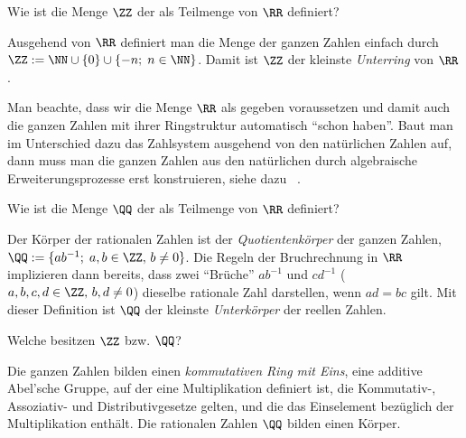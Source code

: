 \begin{frage}
  Wie ist die Menge $\ZZ$ der  
  als Teilmenge von $\RR$ definiert?
\end{frage}

\begin{antwort}
  Ausgehend von $\RR$ definiert man die Menge der ganzen Zahlen einfach 
  durch $\ZZ := \NN \cup \{ 0 \} \cup \{ -n; \; n\in\NN \}$. Damit 
  ist $\ZZ$ der kleinste \textit{Unterring} von $\RR$.  

  Man beachte, dass wir die Menge $\RR$ als gegeben voraussetzen und damit auch 
  die ganzen Zahlen mit ihrer Ringstruktur automatisch "`schon haben"'. 
  Baut man im Unterschied dazu das Zahlsystem ausgehend von den natürlichen 
  Zahlen auf, dann muss man die ganzen Zahlen aus den natürlichen 
  durch algebraische Erweiterungsprozesse erst konstruieren, siehe dazu \zB\ 
  \citep{Kramer}.
  \AntEnd
\end{antwort} 






\begin{frage}
  Wie ist die Menge $\QQ$ der  
  als Teilmenge von $\RR$ definiert?
\end{frage}

\begin{antwort}
  Der Körper der rationalen Zahlen 
  ist der \textit{Quotientenkörper} der 
  ganzen Zahlen, {\dasheisst}  
  $\QQ := \{ ab^{-1}; \; a,b \in \ZZ, \, b\not=0 \}$. 
  Die Regeln der Bruchrechnung in $\RR$ implizieren dann bereits, dass zwei 
  "`Brüche"' $ab^{-1}$ und $cd^{-1}$ ($a,b,c,d \in \ZZ,\, b,d\not=0$)
  dieselbe rationale Zahl darstellen, 
  wenn $ad=bc$ gilt. 
  Mit dieser Definition ist $\QQ$ der kleinste 
  \textit{Unterkörper} der reellen Zahlen.   
  \AntEnd
\end{antwort}






\begin{frage}
  Welche \bold{algebraische Struktur} besitzen $\ZZ$ bzw. $\QQ$?
\end{frage}

\begin{antwort}
  Die ganzen Zahlen bilden einen \textit{kommutativen Ring mit Eins}, 
  {\dasheisst} eine additive Abel'sche 
  Gruppe, auf der eine Multiplikation definiert ist, {\sd} die Kommutativ-, 
  Assoziativ- und Distributivgesetze gelten, 
  und die das Einselement bezüglich der Multiplikation enthält. 
  Die rationalen Zahlen $\QQ$ bilden einen Körper.
  \AntEnd
\end{antwort}






